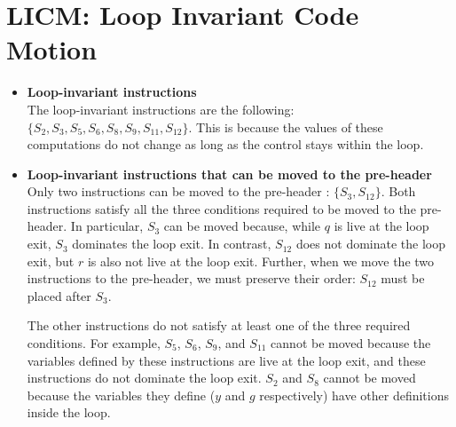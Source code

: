 \section{LICM: Loop Invariant Code Motion}

\begin{itemize}

\item{
    \textbf{Loop-invariant instructions}\\

    The loop-invariant instructions are the following: $\{ S_{2}, S_{3}, S_{5}, S_{6}, S_{8}, S_{9}, S_{11}, S_{12} \}$.
    This is because the values of these computations  do not change as long as the control stays within the  loop.

  }

  \item{
    \textbf{Loop-invariant instructions that can be moved to the pre-header}\\

    Only two instructions can be moved to the pre-header : $\{ S_{3}, S_{12} \}$. Both instructions satisfy all the three conditions required to be moved to the pre-header. In particular, $S_3$ can be moved because, while $q$ is live at the loop exit, $S_3$ dominates the loop exit. In contrast, $S_{12}$ does not dominate the loop exit, but $r$ is also not live at the loop exit. Further, when we move the two instructions to the pre-header, we must preserve their order: $S_{12}$ must be placed after $S_3$.

    The other instructions do not satisfy at least one of the three required conditions. For example, $S_5$, $S_6$, $S_9$, and $S_{11}$ cannot be moved because the variables defined by these instructions are live at the loop exit, and these instructions do not dominate the loop exit. $S_2$ and $S_8$ cannot be moved because the variables they define ($y$ and $g$ respectively) have other definitions inside the loop.
    
  }

\end{itemize}
